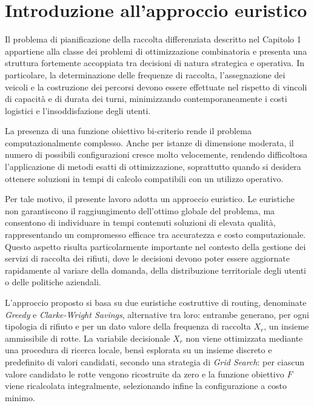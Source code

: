 \section{Introduzione all'approccio euristico}\label{se:prima-sezione}

Il problema di pianificazione della raccolta differenziata descritto nel Capitolo 1 appartiene alla classe dei problemi di ottimizzazione combinatoria e presenta una struttura fortemente accoppiata tra decisioni di natura strategica e operativa. In particolare, la determinazione delle frequenze di raccolta, l'assegnazione dei veicoli e la costruzione dei percorsi devono essere effettuate nel rispetto di vincoli di capacità e di durata dei turni, minimizzando contemporaneamente i costi logistici e l'insoddisfazione degli utenti.

La presenza di una funzione obiettivo bi-criterio rende il problema computazionalmente complesso. Anche per istanze di dimensione moderata, il numero di possibili configurazioni cresce molto velocemente, rendendo difficoltosa l'applicazione di metodi esatti di ottimizzazione, soprattutto quando si desidera ottenere soluzioni in tempi di calcolo compatibili con un utilizzo operativo.

Per tale motivo, il presente lavoro adotta un approccio euristico. Le euristiche non garantiscono il raggiungimento dell'ottimo globale del problema, ma consentono di individuare in tempi contenuti soluzioni di elevata qualità, rappresentando un compromesso efficace tra accuratezza e costo computazionale. Questo aspetto risulta particolarmente importante nel contesto della gestione dei servizi di raccolta dei rifiuti, dove le decisioni devono poter essere aggiornate rapidamente al variare della domanda, della distribuzione territoriale degli utenti o delle politiche aziendali.

L'approccio proposto si basa su due euristiche costruttive di routing, denominate \emph{Greedy} e \emph{Clarke-Wright Savings}, alternative tra loro: entrambe generano, per ogni tipologia di rifiuto e per un dato valore della frequenza di raccolta $X_r$, un insieme ammissibile di rotte. La variabile decisionale $X_r$ non viene ottimizzata mediante una procedura di ricerca locale, bensì esplorata su un insieme discreto e predefinito di valori candidati, secondo una strategia di \emph{Grid Search}: per ciascun valore candidato le rotte vengono ricostruite da zero e la funzione obiettivo $F$ viene ricalcolata integralmente, selezionando infine la configurazione a costo minimo.

